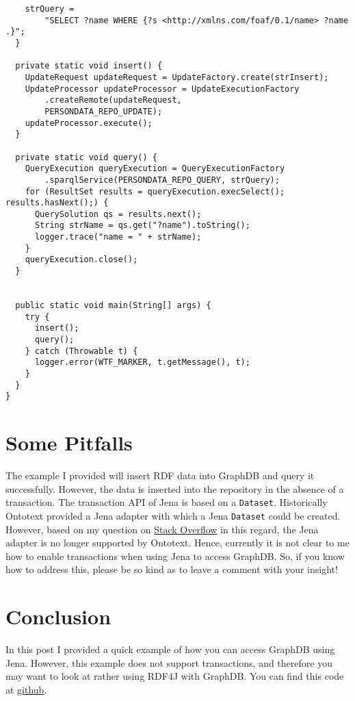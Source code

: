 \documentclass{amsart}
\begin{document}
\begin{small}
\begin{verbatim}
    strQuery = 
        "SELECT ?name WHERE {?s <http://xmlns.com/foaf/0.1/name> ?name .}";
  }   
  
  private static void insert() {
    UpdateRequest updateRequest = UpdateFactory.create(strInsert);
    UpdateProcessor updateProcessor = UpdateExecutionFactory
        .createRemote(updateRequest, 
        PERSONDATA_REPO_UPDATE);
    updateProcessor.execute();
  }
  
  private static void query() {
    QueryExecution queryExecution = QueryExecutionFactory
        .sparqlService(PERSONDATA_REPO_QUERY, strQuery);
    for (ResultSet results = queryExecution.execSelect(); results.hasNext();) {
      QuerySolution qs = results.next();
      String strName = qs.get("?name").toString();
      logger.trace("name = " + strName);
    }    
    queryExecution.close();
  }

  
  public static void main(String[] args) {
    try {
      insert(); 
      query();      
    } catch (Throwable t) {
      logger.error(WTF_MARKER, t.getMessage(), t);
    }   
  }  
}
\end{verbatim}
\end{small} 

 \section{Some Pitfalls}
 The example I  provided will insert RDF data into GraphDB and query it successfully. However, the data is inserted into the repository in the absence of a transaction. The transaction API of Jena is based on a \texttt{Dataset}. Historically Ontotext provided a Jena adapter with which a Jena \texttt{Dataset} could be created. However, based on my question on \href{https://stackoverflow.com/questions/51098996/writing-to-ontotext-graphdb-using-jena}{Stack Overflow} in this regard, the Jena adapter is no longer supported by Ontotext. Hence, currently it is not clear to me how to enable transactions when using Jena to access GraphDB. So, if you know how to address this, please be so kind as to leave a comment with your insight!
 
 \section{Conclusion}
 In this post I provided a quick example of how you can access GraphDB using Jena. However, this example does not support transactions, and therefore you may want to look at rather using RDF4J with GraphDB. You can find this code at \href{https://github.com/henrietteharmse/henrietteharmse/tree/master/blog/tutorial/graphdb/source/jena}{github}.
  
  
  
 
\end{document}
